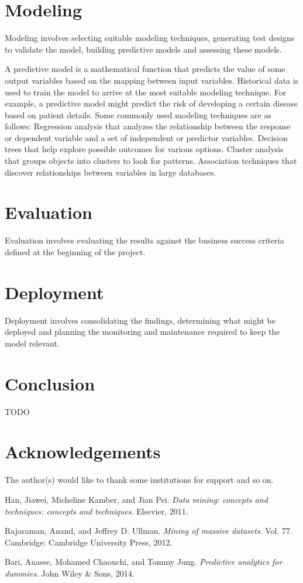 \documentclass[CEJM,PDF]{cej} %
\begin{document}
\section{Modeling}
Modeling involves selecting suitable modeling techniques, generating test designs to validate the model, building predictive models and assessing these models.


A predictive model is a mathematical function that predicts the value of some output variables based on the mapping between input variables. Historical data is used to train the model to arrive at the most suitable modeling technique. For example, a predictive model might predict the risk of developing a certain disease based on patient details. Some commonly used modeling techniques are as follows:
Regression analysis that analyzes the relationship between the response or dependent variable and a set of independent or predictor variables. Decision trees that help explore possible outcomes for various options. Cluster analysis that groups objects into clusters to look for patterns. Association techniques that discover relationships between variables in large databases.

\section{Evaluation}
Evaluation involves evaluating the results against the business success criteria defined at the beginning of the project.


\section{Deployment}
Deployment involves consolidating the findings, determining what might be deployed and planning the monitoring and maintenance required to keep the model relevant.

\section{Conclusion}
TODO


\section*{Acknowledgements}

The author(s) would like to thank some institutions for support and so on.


\begin{thebibliography}{9}

Han, Jiawei, Micheline Kamber, and Jian Pei.\textit{ Data mining: concepts and techniques: concepts and techniques}. Elsevier, 2011.

 Rajaraman, Anand, and Jeffrey D. Ullman. \textit{Mining of massive datasets}. Vol. 77. Cambridge: Cambridge University Press, 2012.

 Bari, Anasse, Mohamed Chaouchi, and Tommy Jung. \textit{Predictive analytics for dummies}. John Wiley \& Sons, 2014.	

\end{thebibliography}
\end{document}
